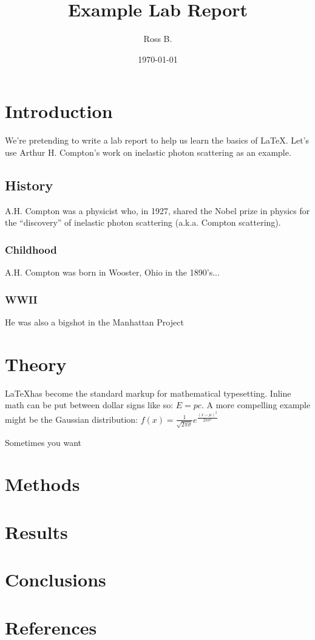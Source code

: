 \documentclass[11pt]{article}
\title{Example Lab Report}
\author{Ross B.}
\date{\today}
\begin{document}
\maketitle

\section{Introduction}
We're pretending to write a lab report to help us learn the basics of \LaTeX.
Let's use Arthur H. Compton's work on inelastic photon scattering as an 
example.

\subsection{History}
A.H. Compton was a physicist who, in 1927, shared the Nobel prize in physics 
for the ``discovery'' of inelastic photon scattering (a.k.a. Compton
scattering).
\subsubsection*{Childhood}
A.H. Compton was born in Wooster, Ohio in the 1890's... 
\subsubsection*{WWII}
He was also a bigshot in the Manhattan Project

\section{Theory}
\LaTeX has become the standard markup for mathematical typesetting. 
Inline math can be put between dollar signs like so: $E = pc$.
A more compelling example might be the Gaussian distribution:
$f(x) = \frac{1}{\sqrt{2\pi\sigma}} e^{\frac{(x - \mu)^2}{2\pi\sigma^2}}$

Sometimes you want
\section{Methods}
\section{Results}
\section{Conclusions}
\section{References}
\end{document}
